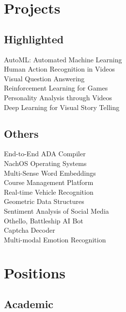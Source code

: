 \documentclass[]{cv-openfont}
\begin{document}
\begin{minipage}[t]{0.31\textwidth}

\section{Projects}

\subsection{Highlighted}
AutoML: Automated Machine Learning \\
Human Action Recognition in Videos \\
Visual Question Answering \\
Reinforcement Learning for Games \\
Personality Analysis through Videos \\
Deep Learning for Visual Story Telling \\
\sectionsep

\subsection{Others}
End-to-End ADA Compiler \\
NachOS Operating Systems \\
Multi-Sense Word Embeddings \\
Course Management Platform \\
Real-time Vehicle Recognition \\
Geometric Data Structures \\
Sentiment Analysis of Social Media \\
Othello, Battleship AI Bot \\
Captcha Decoder \\
Multi-modal Emotion Recognition \\


\section{Positions}
\subsection{Academic}
\sectionsep


\end{minipage}
\end{document}
